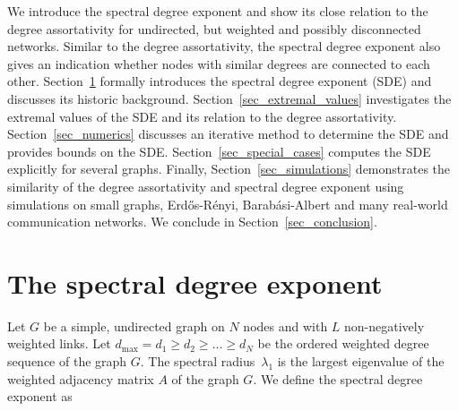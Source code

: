 \documentclass{comnet}%
\newcommand{\ER}{Erd\H{o}s-R\'{e}nyi}
\newcommand{\BA}{Barab{\'a}si-Albert}
\begin{document}
We introduce the spectral degree exponent and show its close relation to the degree assortativity for undirected, but weighted and possibly disconnected networks. Similar to the degree assortativity, the spectral degree exponent also gives an indication whether nodes with similar degrees are connected to each other. Section~\ref{sec_introduce} formally introduces the spectral degree exponent (SDE) and discusses its historic background. Section~\ref{sec_extremal_values} investigates the extremal values of the SDE and its relation to the degree assortativity. Section~\ref{sec_numerics} discusses an iterative method to determine the SDE and provides bounds on the SDE. Section~\ref{sec_special_cases} computes the SDE explicitly for several graphs. Finally, Section~\ref{sec_simulations} demonstrates the similarity of the degree assortativity and spectral degree exponent using simulations on small graphs, \ER{}, \BA{} and many real-world communication networks. We conclude in Section~\ref{sec_conclusion}.


\section{The spectral degree exponent}\label{sec_introduce}
Let $G$ be a simple, undirected graph on $N$ nodes and with $L$ non-negatively weighted links. Let $d_{\max} = d_1 \geq d_2 \geq \ldots \geq d_N$ be the ordered weighted degree sequence of the graph $G$. The spectral radius~$\lambda_1$ is the largest eigenvalue of the weighted adjacency matrix $A$ of the graph $G$. We define the spectral degree exponent as
\end{document}
